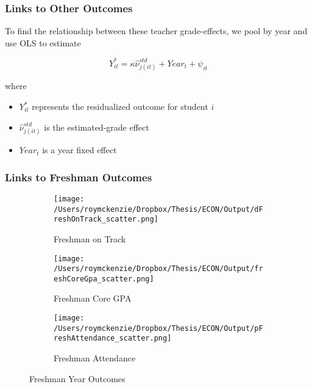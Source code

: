 \documentclass{beamer}
\begin{document}
\begin{frame}
\frametitle{Links to Other Outcomes}

To find the relationship between these teacher grade-effects, we pool by year and use OLS to estimate 

\begin{equation}
	Y_{it}^* = \kappa \hat{\nu}_{j(it)}^{std} + Year_{t} + \psi_{it}
\end{equation}

where 

\begin{itemize}
	\item $Y_{it}^*$ represents the residualized outcome for student $i$
	\item $\hat{\nu}_{j(it)}^{std}$ is the estimated-grade effect
	\item $Year_{t}$ is a year fixed effect
\end{itemize}
\end{frame}


\begin{frame}
\frametitle{Links to Freshman Outcomes}

\begin{figure}
     \centering
     \begin{subfigure}[b]{0.3\textwidth}
         \centering
         \texttt{[image: /Users/roymckenzie/Dropbox/Thesis/ECON/Output/dFreshOnTrack\_scatter.png]}
         \caption{Freshman on Track}
         \label{fig:dFreshOnTrack}
     \end{subfigure}
     \hfill
     \begin{subfigure}[b]{0.3\textwidth}
         \centering
         \texttt{[image: /Users/roymckenzie/Dropbox/Thesis/ECON/Output/freshCoreGpa\_scatter.png]}
         \caption{Freshman Core GPA}
         \label{fig:freshCoreGpa}
     \end{subfigure}
     \hfill
     \begin{subfigure}[b]{0.3\textwidth}
         \centering
         \texttt{[image: /Users/roymckenzie/Dropbox/Thesis/ECON/Output/pFreshAttendance\_scatter.png]}
         \caption{Freshman Attendance}
         \label{fig:pFreshAttendance}
     \end{subfigure}
        \caption{Freshman Year Outcomes}
        \label{fig:fresh}
\end{figure}


\end{frame}
\end{document}
